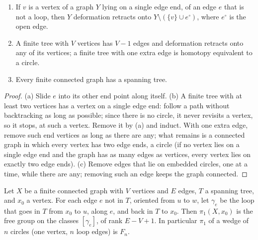 \begin{lemma}\label{lem:trees}
\begin{enumerate}
\item[(a)] If $v$ is a vertex of a graph $Y$ lying on a single edge end, of an edge $e$ that is not a loop, then $Y$ deformation retracts onto $Y\setminus(\{v\}\cup e^\circ)$, where $e^\circ$ is the open edge.
\item[(b)] A finite tree with $V$ vertices has $V-1$ edges and deformation retracts onto any of its vertices; a finite tree with one extra edge is homotopy equivalent to a circle.
\item[(c)] Every finite connected graph has a spanning tree.
\end{enumerate}
\end{lemma}

\begin{proof}
(a) Slide $e$ into its other end point along itself. (b) A finite tree with at least two vertices has a vertex on a single edge end: follow a path without backtracking as long as possible;
since there is no circle, it never revisits a vertex, so it stops, at such a vertex. Remove it by (a) and induct. With one extra edge, remove such end vertices as long as there are any; what
remains is a connected graph in which every vertex has two edge ends, a circle (if no vertex lies on a single edge end and the graph has as many edges as vertices, every vertex lies on exactly
two edge ends). (c) Remove edges that lie on embedded circles, one at a time, while there are any; removing such an edge keeps the graph connected.
\end{proof}

\begin{theorem}\label{thm:wedge}
Let $X$ be a finite connected graph with $V$ vertices and $E$ edges, $T$ a spanning tree, and $x_0$ a vertex. For each edge $e$ not in $T$, oriented from $u$ to $w$, let $\gamma_e$ be the loop that goes in
$T$ from $x_0$ to $u$, along $e$, and back in $T$ to $x_0$. Then $\pi_1(X,x_0)$ is the free group on the classes $[\gamma_e]$, of rank $E-V+1$. In particular $\pi_1$ of a wedge of $n$ circles (one
vertex, $n$ loop edges) is $F_n$.
\end{theorem}

